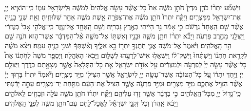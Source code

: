 \documentclass[twoside, openany, parskip=half, 11pt]{book}
\begin{document}
\begin{footnotesize}
\begin{multicols}{2}
\\
 וַיִּשְׁמַ֞ע יִתְר֨וֹ כֹהֵ֤ן מִדְיָן֙ חֹתֵ֣ן מֹשֶׁ֔ה אֵת֩ כָּל־אֲשֶׁ֨ר עָשָׂ֤ה אֱלֹהִים֙ לְמֹשֶׁ֔ה וּֽלְיִשְׂרָאֵ֖ל עַמּ֑וֹ כִּֽי־הוֹצִ֧יא יְיָ֛ אֶת־יִשְׂרָאֵ֖ל מִמִּצְרָֽיִם׃ וַיִּקַּ֗ח יִתְרוֹ֙ חֹתֵ֣ן מֹשֶׁ֔ה אֶת־צִפֹּרָ֖ה אֵ֣שֶׁת מֹשֶׁ֑ה אַחַ֖ר שִׁלּוּחֶֽיהָ׃ וְאֵ֖ת שְׁנֵ֣י בָנֶ֑יהָ אֲשֶׁ֨ר שֵׁ֤ם הָֽאֶחָד֙ גֵּֽרְשֹׁ֔ם כִּ֣י אָמַ֔ר גֵּ֣ר הָיִ֔יתִי בְּאֶ֖רֶץ נָכְרִיָּֽה׃ וְשֵׁ֥ם הָֽאֶחָ֖ד אֱלִיעֶ֑זֶר כִּֽי־אֱלֹהֵ֤י אָבִי֙ בְּעֶזְרִ֔י וַיַּצִּלֵ֖נִי מֵחֶ֥רֶב פַּרְעֹֽה׃  וַיָּבֹ֞א יִתְר֨וֹ חֹתֵ֥ן מֹשֶׁ֛ה וּבָנָ֥יו וְאִשְׁתּ֖וֹ אֶל־מֹשֶׁ֑ה אֶ֨ל־הַמִּדְבָּ֔ר אֲשֶׁר־ה֛וּא חֹנֶ֥ה שָׁ֖ם הַ֥ר הָֽאֱלֹהִֽים׃ וַיֹּ֨אמֶר֙ אֶל־מֹשֶׁ֔ה אֲנִ֛י חֹֽתֶנְךָ֥ יִתְר֖וֹ בָּ֣א אֵלֶ֑יךָ וְאִ֨שְׁתְּךָ֔ וּשְׁנֵ֥י בָנֶ֖יהָ עִמָּֽהּ׃ וַיֵּצֵ֨א מֹשֶׁ֜ה לִקְרַ֣את חֹֽתְנ֗וֹ וַיִּשְׁתַּ֨חוּ֙ וַיִּשַּׁק־ל֔וֹ וַיִּשְׁאֲל֥וּ אִישׁ־לְרֵעֵ֖הוּ לְשָׁל֑וֹם וַיָּבֹ֖אוּ הָאֹֽהֱלָה׃ וַיְסַפֵּ֤ר מֹשֶׁה֙ לְחֹ֣תְנ֔וֹ אֵת֩ כָּל־אֲשֶׁ֨ר עָשָׂ֤ה יְיָ֙ לְפַרְעֹ֣ה וּלְמִצְרַ֔יִם עַ֖ל אוֹדֹ֣ת יִשְׂרָאֵ֑ל אֵ֤ת כָּל־הַתְּלָאָה֙ אֲשֶׁ֣ר מְצָאָ֣תַם בַּדֶּ֔רֶךְ וַיַּצִּלֵ֖ם יְיָ׃  וַיִּ֣חַדְּ יִתְר֔וֹ עַ֚ל כָּל־הַטּוֹבָ֔ה אֲשֶׁר־עָשָׂ֥ה יְיָ֖ לְיִשְׂרָאֵ֑ל אֲשֶׁ֥ר הִצִּיל֖וֹ מִיַּ֥ד מִצְרָֽיִם׃ וַיֹּ֘אמֶר֘ יִתְרוֹ֒ בָּר֣וּךְ יְיָ֔ אֲשֶׁ֨ר הִצִּ֥יל אֶתְכֶ֛ם מִיַּ֥ד מִצְרַ֖יִם וּמִיַּ֣ד פַּרְעֹ֑ה אֲשֶׁ֤ר הִצִּיל֙ אֶת־הָעָ֔ם מִתַּ֖חַת יַד־מִצְרָֽיִם׃ עַתָּ֣ה יָדַ֔עְתִּי כִּֽי־גָד֥וֹל יְיָ֖ מִכָּל־הָֽאֱלֹהִ֑ים כִּ֣י בַדָּבָ֔ר אֲשֶׁ֥ר זָד֖וּ עֲלֵיהֶֽם׃ וַיִּקַּ֞ח יִתְר֨וֹ חֹתֵ֥ן מֹשֶׁ֛ה עֹלָ֥ה וּזְבָחִ֖ים לֵֽאלֹהִ֑ים וַיָּבֹ֨א אַֽהֲרֹ֜ן וְכֹ֣ל זִקְנֵ֣י יִשְׂרָאֵ֗ל לֶֽאֱכָל־לֶ֛חֶם עִם־חֹתֵ֥ן מֹשֶׁ֖ה לִפְנֵ֥י הָֽאֱלֹהִֽים׃


\end{multicols}
\end{footnotesize}
\end{document}
